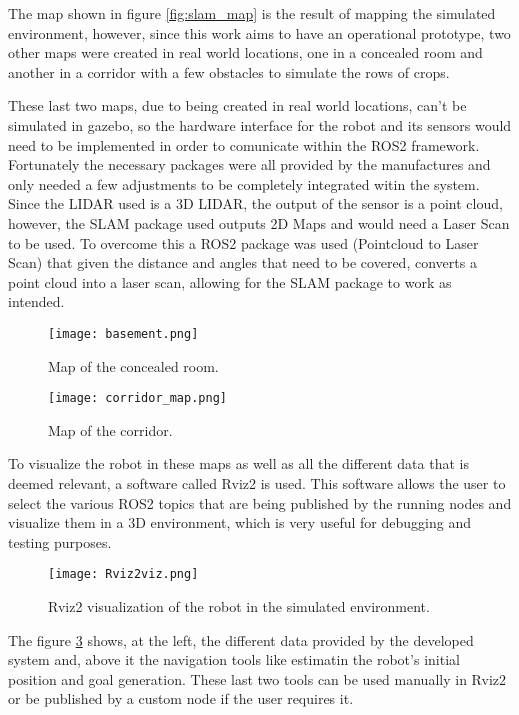 The map shown in figure \ref{fig:slam_map} is the result of mapping the simulated environment, 
however, since this work aims to have an operational prototype, two other maps were created 
in real world locations, one in a concealed room and another in a corridor with a few obstacles to simulate the rows 
of crops. 

These last two maps, due to being created in real world locations, can't be 
simulated in gazebo, so the hardware interface for the robot and its sensors 
would need to be implemented in order to comunicate within the \gls{ROS2} framework. 
Fortunately the necessary packages were all provided by the manufactures \cite{ScoutRepo, RoboSense} and only needed a few adjustments to 
be completely integrated witin the system. Since the LIDAR used is a 3D LIDAR, the output 
of the sensor is a point cloud, however, the \gls{SLAM} package used outputs 2D Maps and would need a 
Laser Scan to be used. To overcome this a \gls{ROS2} package was used (Pointcloud to Laser Scan) that 
given the distance and angles that need to be covered, converts a point cloud into a laser scan, 
allowing for the \gls{SLAM} package to work as intended.
\begin{figure}[H]
    \centering
    \texttt{[image: basement.png]}
    \caption{Map of the concealed room.}
    \label{fig:basement_map}
\end{figure}
\begin{figure}[H]
    \centering
    \texttt{[image: corridor\_map.png]}
    \caption{Map of the corridor.}
    \label{fig:corridor_map}
\end{figure}

To visualize the robot in these maps as well as all the different data that is deemed relevant, a software called 
Rviz2 is used. This software allows the user to select the various \gls{ROS2} topics that are being published 
by the running nodes and visualize them in a 3D environment, which is very useful for debugging and testing purposes.
\begin{figure}[H]
    \centering
    \texttt{[image: Rviz2viz.png]}
    \caption{Rviz2 visualization of the robot in the simulated environment.}
    \label{fig:rviz2_visualization}
\end{figure}

The figure \ref{fig:rviz2_visualization} shows, at the left, the different data provided by the developed system and, above it the 
navigation tools like estimatin the robot's initial position and goal generation. These last two tools can be used manually 
in Rviz2 or be published by a custom node if the user requires it.

